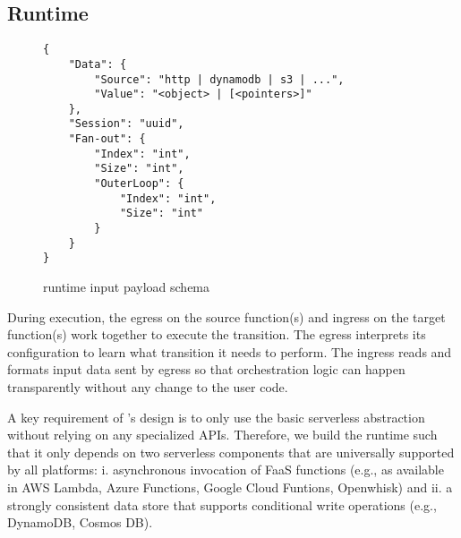 \subsection{\name{} Runtime}\label{sec:runtime}


\begin{figure}[]
    \begin{verbatim}
{
    "Data": {
        "Source": "http | dynamodb | s3 | ...",
        "Value": "<object> | [<pointers>]"
    },
    "Session": "uuid",
    "Fan-out": {
        "Index": "int",
        "Size": "int",
        "OuterLoop": {
            "Index": "int",
            "Size": "int"
        }
    }
}
    \end{verbatim}
    \caption{\name{} runtime input payload schema}
    \label{fig:input-format}
\end{figure}

During execution, the egress on the source function(s) and ingress on the
target function(s) work together to execute the transition. The egress
interprets its \name{} configuration to learn what transition it needs to perform.
The ingress reads and formats input data sent by egress so that
\name{} orchestration logic can happen transparently without any change to the
user code.

A key requirement of \name{}'s design is to only use the basic serverless
abstraction without relying on any specialized APIs. Therefore, we build the
runtime such that it only depends on two serverless components that are
universally supported by all platforms: i.
asynchronous invocation of FaaS functions (e.g., as available in AWS Lambda, Azure Functions,
Google Cloud Funtions, Openwhisk) and ii. a strongly consistent data store
that supports conditional write operations (e.g., DynamoDB, Cosmos DB).

